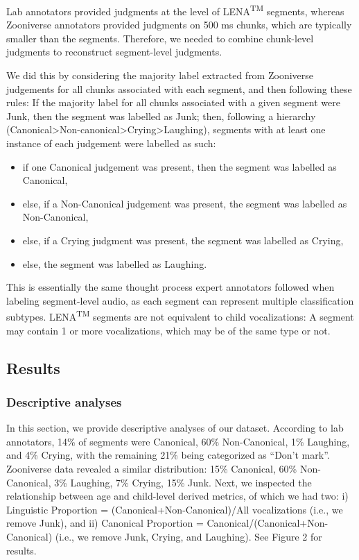 \documentclass[english,,man]{apa6}
\providecommand{\tightlist}{%
  \setlength{\itemsep}{0pt}\setlength{\parskip}{0pt}}
\begin{document}
Lab annotators provided judgments at the level of LENA\textsuperscript{TM} segments, whereas Zooniverse annotators provided judgments on 500 ms chunks, which are typically smaller than the segments. Therefore, we needed to combine chunk-level judgments to reconstruct segment-level judgments.

We did this by considering the majority label extracted from Zooniverse judgements for all chunks associated with each segment, and then following these rules: If the majority label for all chunks associated with a given segment were Junk, then the segment was labelled as Junk; then, following a hierarchy (Canonical\textgreater{}Non-canonical\textgreater{}Crying\textgreater{}Laughing), segments with at least one instance of each judgement were labelled as such:

\begin{itemize}
\tightlist
\item
  if one Canonical judgement was present, then the segment was labelled as Canonical,
\item
  else, if a Non-Canonical judgement was present, the segment was labelled as Non-Canonical,
\item
  else, if a Crying judgment was present, the segment was labelled as Crying,
\item
  else, the segment was labelled as Laughing.
\end{itemize}

This is essentially the same thought process expert annotators followed when labeling segment-level audio, as each segment can represent multiple classification subtypes. LENA\textsuperscript{TM} segments are not equivalent to child vocalizations: A segment may contain 1 or more vocalizations, which may be of the same type or not.

\hypertarget{results}{%
\subsection{Results}\label{results}}

\hypertarget{descriptive-analyses}{%
\subsubsection{Descriptive analyses}\label{descriptive-analyses}}

In this section, we provide descriptive analyses of our dataset. According to lab annotators, 14\% of segments were Canonical, 60\% Non-Canonical, 1\% Laughing, and 4\% Crying, with the remaining 21\% being categorized as \enquote{Don't mark}. Zooniverse data revealed a similar distribution: 15\% Canonical, 60\% Non-Canonical, 3\% Laughing, 7\% Crying, 15\% Junk.
Next, we inspected the relationship between age and child-level derived metrics, of which we had two: i) Linguistic Proportion = (Canonical+Non-Canonical)/All vocalizations (i.e., we remove Junk), and ii) Canonical Proportion = Canonical/(Canonical+Non-Canonical) (i.e., we remove Junk, Crying, and Laughing). See Figure 2 for results.
\end{document}
